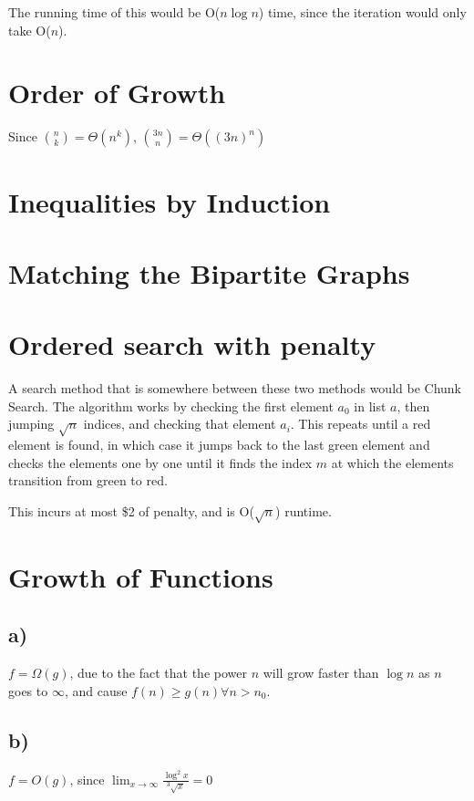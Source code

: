 \documentclass[14pt, letterpaper]{article}
\begin{document}
The running time of this would be O($n \log n$) time, since the iteration would
only take O($n$).

\section{Order of Growth}
Since $\displaystyle {n \choose k} = \Theta(n^k)$, $\displaystyle {3n \choose n} = \Theta((3n)^n)$

\section{Inequalities by Induction}

\section{Matching the Bipartite Graphs}

\section{Ordered search with penalty}
A search method that is somewhere between these two methods would be Chunk
Search. The algorithm works by checking the first element $a_0$ in list $a$,
then jumping $\sqrt n$ indices, and checking that element $a_i$. This
repeats until a red element is found, in which case it jumps back to the last
green element and checks the elements one by one until it finds the index $m$
at which the elements transition from green to red.

This incurs at most \$2 of penalty, and is O($\sqrt n$) runtime.

\section{Growth of Functions}
\subsection{a)}
$f = \Omega(g)$, due to the fact that the power $n$ will grow faster than
$\log n$ as $n$ goes to $\infty$, and cause $f(n) \geq g(n) \forall n > n_0$.

\subsection{b)}
$f = O(g)$, since $\displaystyle \lim_{x \to \infty} \frac{\log^2 x}{^3\sqrt x} = 0$
\end{document}

